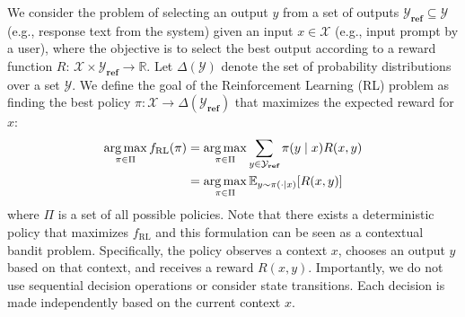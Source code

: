 We consider the problem of selecting an output $y$ from a set of outputs $\mathcal{Y}_{\textbf{ref}} \subseteq \mathcal{Y}$ (e.g., response text from the system) given an input $x \in \mathcal{X}$ (e.g., input prompt by a user), where the objective is to select the best output according to a reward function $R$: $\mathcal{X} \times \mathcal{Y}_{\textbf{ref}}  \rightarrow \mathbb{R}$.
Let $\Delta(\mathcal{Y})$ denote the set of probability distributions over a set $\mathcal{Y}$.
We define the goal of the Reinforcement Learning (RL) problem as finding the best policy $\pi: \mathcal{X} \rightarrow \Delta(\mathcal{Y}_{\textbf{ref}})$ that maximizes the expected reward for $x$:
\begin{equation}
\begin{aligned}
\operatorname*{arg\,max}_{\pi \in \Pi} f_\textrm{RL}(\pi) &=\operatorname*{arg\,max}_{\pi \in \Pi}\sum_{y \in \mathcal{Y}_{\textbf{ref}}} \pi(y \mid x)R(x,y)\\
    &=\operatorname*{arg\,max}_{\pi \in \Pi} \mathbb{E}_{y \sim \pi(\cdot \mid x)}[R(x, y)]\label{eq:rl}\\
\end{aligned}
\end{equation}
where $\Pi$ is a set of all possible policies.
Note that there exists a deterministic policy that maximizes $f_\mathrm{RL}$ \citep{sutton2018reinforcement} and this formulation can be seen as a contextual bandit problem. Specifically, the policy observes a context $x$, chooses an output $y$ based on that context, and receives a reward $R(x, y)$. Importantly, we do not use sequential decision operations or consider state transitions. Each decision is made independently based on the current context $x$.

